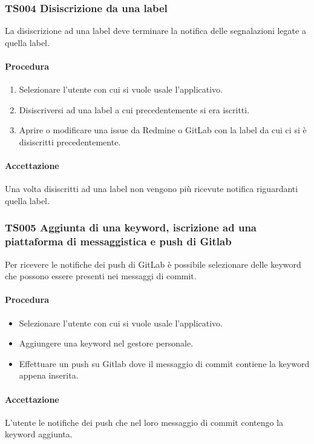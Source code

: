 	\subsubsection{TS004 Disiscrizione da una label}
		La disiscrizione ad una label deve terminare la notifica delle segnalazioni legate a quella label.
		
		\paragraph*{Procedura}
			\begin{enumerate}
				\item Selezionare l'utente con cui si vuole usale l'applicativo.
				\item Disiscriversi ad una label a cui precedentemente si era iscritti.
				\item Aprire o modificare una issue da Redmine o GitLab con la label da cui ci si è disiscritti precedentemente.
			\end{enumerate}
		
		\paragraph*{Accettazione}
		Una volta disiscritti ad una label non vengono più ricevute notifica riguardanti quella label.
		
	\subsubsection{TS005 Aggiunta di una keyword, iscrizione ad una piattaforma di messaggistica e push di Gitlab}
		Per ricevere le notifiche dei push di GitLab è possibile selezionare delle keyword che possono essere presenti nei messaggi di commit.
		
		\paragraph*{Procedura}
		\begin{itemize}
			\item Selezionare l'utente con cui si vuole usale l'applicativo.
			\item Aggiungere una keyword nel gestore personale.
			\item Effettuare un push su Gitlab dove il messaggio di commit contiene la keyword appena inserita.
		\end{itemize}
	
		\paragraph*{Accettazione}
		L'utente le notifiche dei push che nel loro messaggio di commit contengo la keyword aggiunta.
	
